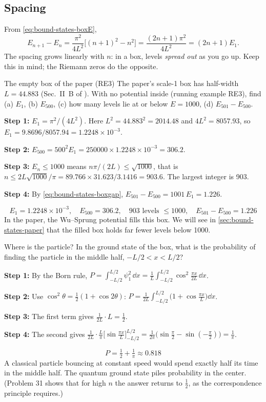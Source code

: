 \subsection{Spacing}

From \cref{eq:bound-states-boxE},
\begin{equation}
E_{n+1}-E_n=\frac{\pi^2}{4L^2}\bigl[(n+1)^2-n^2\bigr]=\frac{(2n+1)\pi^2}{4L^2}=(2n+1)E_1 .
\label{eq:bound-states-boxgap}
\end{equation}
The spacing grows linearly with $n$: in a box, levels \emph{spread out} as you go up. Keep this in mind; the Riemann zeros do the opposite.

\begin{sample}{The empty box of the paper (RE3)}
The paper's scale-1 box has half-width $L=44.883$ (Sec.~II~B of \cite{soniR1}). With no potential inside (running example RE3), find (a) $E_1$, (b) $E_{500}$, (c) how many levels lie at or below $E=1000$, (d) $E_{501}-E_{500}$.

\textbf{Step 1:} $E_1=\pi^2/(4L^2)$. Here $L^2=44.883^2=2014.48$ and $4L^2=8057.93$, so $E_1=9.8696/8057.94=1.2248\times10^{-3}$.

\textbf{Step 2:} $E_{500}=500^2E_1=250000\times1.2248\times10^{-3}=306.2$.

\textbf{Step 3:} $E_n\le1000$ means $n\pi/(2L)\le\sqrt{1000}$, that is $n\le 2L\sqrt{1000}/\pi=89.766\times31.623/3.1416=903.6$. The largest integer is 903.

\textbf{Step 4:} By \cref{eq:bound-states-boxgap}, $E_{501}-E_{500}=1001\,E_1=1.226$.

\[
\boxed{E_1=1.2248\times10^{-3},\quad E_{500}=306.2,\quad 903 \text{ levels } \le 1000,\quad E_{501}-E_{500}=1.226}
\]
In the paper, the Wu--Sprung potential fills this box. We will see in \cref{sec:bound-states-paper} that the filled box holds far fewer levels below 1000.
\end{sample}

\begin{sample}{Where is the particle?}
In the ground state of the box, what is the probability of finding the particle in the middle half, $-L/2<x<L/2$?

\textbf{Step 1:} By the Born rule, $P=\int_{-L/2}^{L/2}\psi_1^2\,\dd x=\frac1L\int_{-L/2}^{L/2}\cos^2\frac{\pi x}{2L}\,\dd x$.

\textbf{Step 2:} Use $\cos^2\theta=\tfrac12(1+\cos2\theta)$: $P=\frac{1}{2L}\int_{-L/2}^{L/2}\bigl(1+\cos\frac{\pi x}{L}\bigr)\dd x$.

\textbf{Step 3:} The first term gives $\frac{1}{2L}\cdot L=\frac12$.

\textbf{Step 4:} The second gives $\frac{1}{2L}\cdot\frac{L}{\pi}\bigl[\sin\frac{\pi x}{L}\bigr]_{-L/2}^{L/2}=\frac{1}{2\pi}\bigl(\sin\frac{\pi}{2}-\sin(-\frac{\pi}{2})\bigr)=\frac1\pi$.

\[
\boxed{P=\tfrac12+\tfrac1\pi\approx0.818}
\]
A classical particle bouncing at constant speed would spend exactly half its time in the middle half. The quantum ground state piles probability in the center. (Problem 31 shows that for high $n$ the answer returns to $\tfrac12$, as the correspondence principle requires.)
\end{sample}

